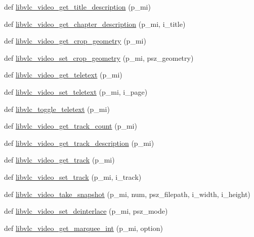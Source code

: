 \begin{DoxyCompactItemize}
def \hyperlink{namespacesrc_1_1lib_1_1vlc_a865f6dc99fabe59f4665a336bab1dbbb}{libvlc\+\_\+video\+\_\+get\+\_\+title\+\_\+description} (p\+\_\+mi)
\item 
def \hyperlink{namespacesrc_1_1lib_1_1vlc_a92899e17b4b8add9ca47c13c2be7b3e0}{libvlc\+\_\+video\+\_\+get\+\_\+chapter\+\_\+description} (p\+\_\+mi, i\+\_\+title)
\item 
def \hyperlink{namespacesrc_1_1lib_1_1vlc_a2ba6f211e33ad60bc89fc96dc83a9bfe}{libvlc\+\_\+video\+\_\+get\+\_\+crop\+\_\+geometry} (p\+\_\+mi)
\item 
def \hyperlink{namespacesrc_1_1lib_1_1vlc_ad84fc046681f7d6674f910f5388ff4df}{libvlc\+\_\+video\+\_\+set\+\_\+crop\+\_\+geometry} (p\+\_\+mi, psz\+\_\+geometry)
\item 
def \hyperlink{namespacesrc_1_1lib_1_1vlc_aa3fa4325cdb9da2749729d6c402b7966}{libvlc\+\_\+video\+\_\+get\+\_\+teletext} (p\+\_\+mi)
\item 
def \hyperlink{namespacesrc_1_1lib_1_1vlc_adf75d5be2292076cf1dc656188660390}{libvlc\+\_\+video\+\_\+set\+\_\+teletext} (p\+\_\+mi, i\+\_\+page)
\item 
def \hyperlink{namespacesrc_1_1lib_1_1vlc_ad3a8979a8a5e0029ab5edadaefa0ea2c}{libvlc\+\_\+toggle\+\_\+teletext} (p\+\_\+mi)
\item 
def \hyperlink{namespacesrc_1_1lib_1_1vlc_a7380f74b96b4dd3d84f82db83d6036f0}{libvlc\+\_\+video\+\_\+get\+\_\+track\+\_\+count} (p\+\_\+mi)
\item 
def \hyperlink{namespacesrc_1_1lib_1_1vlc_ae3c86ae102fa73eb68639578f864c8d3}{libvlc\+\_\+video\+\_\+get\+\_\+track\+\_\+description} (p\+\_\+mi)
\item 
def \hyperlink{namespacesrc_1_1lib_1_1vlc_ae6b14fc5487cd1d84234634af5739d9d}{libvlc\+\_\+video\+\_\+get\+\_\+track} (p\+\_\+mi)
\item 
def \hyperlink{namespacesrc_1_1lib_1_1vlc_a39513dcdc19667f5b3fa9b90ad475067}{libvlc\+\_\+video\+\_\+set\+\_\+track} (p\+\_\+mi, i\+\_\+track)
\item 
def \hyperlink{namespacesrc_1_1lib_1_1vlc_ae5192e14acc1635f9844539692ddad4c}{libvlc\+\_\+video\+\_\+take\+\_\+snapshot} (p\+\_\+mi, num, psz\+\_\+filepath, i\+\_\+width, i\+\_\+height)
\item 
def \hyperlink{namespacesrc_1_1lib_1_1vlc_a564f0ddd3a82c4ebe76214297d29b933}{libvlc\+\_\+video\+\_\+set\+\_\+deinterlace} (p\+\_\+mi, psz\+\_\+mode)
\item 
def \hyperlink{namespacesrc_1_1lib_1_1vlc_a3213c93d9c501e5b2fa8ef1ba0ce6e91}{libvlc\+\_\+video\+\_\+get\+\_\+marquee\+\_\+int} (p\+\_\+mi, option)

\end{DoxyCompactItemize}
